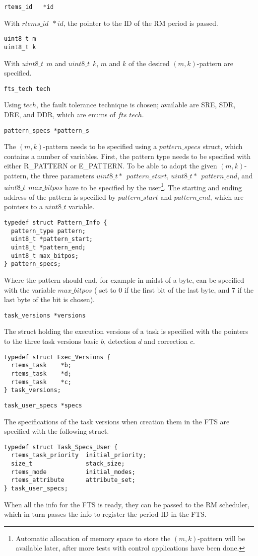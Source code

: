 \begin{verbatim}
rtems_id   *id
\end{verbatim}
With $rtems\_id~~*id$, the pointer to the ID of the RM period is passed. 
\begin{verbatim}
uint8_t m
uint8_t k
\end{verbatim}
With $uint8\_t~~m$ and $uint8\_t~~k$, $m$ and $k$ of the desired $(m,k)$-pattern are specified.
\begin{verbatim}
fts_tech tech
\end{verbatim}
Using $tech$, the fault tolerance technique is chosen; available are \mbox{SRE}, \mbox{SDR}, \mbox{DRE}, and \mbox{DDR}, which are enums of $fts\_tech$.
\begin{verbatim}
pattern_specs *pattern_s
\end{verbatim}
The $(m,k)$-pattern needs to be specified using a $pattern\_specs$ struct, which contains a number of variables. First, the pattern type needs to be specified with either \mbox{R\_PATTERN} or \mbox{E\_PATTERN}. To be able to adopt the given $(m,k)$-pattern, the three parameters $uint8\_t*~~  pattern\_start$, $uint8\_t*~~pattern\_end$, and $uint8\_t~~max\_bitpos$ have to be specified by the user\footnote{Automatic allocation of memory space to store the $(m,k)$-pattern will be available later, after more tests with control applications have been done.}.
The starting and ending address of the pattern is specified by $pattern\_start$ and $pattern\_end$, which are pointers to a $uint8\_t$ variable.
\begin{verbatim}
typedef struct Pattern_Info {
  pattern_type pattern;
  uint8_t *pattern_start;
  uint8_t *pattern_end;
  uint8_t max_bitpos;
} pattern_specs;
\end{verbatim} 
Where the pattern should end, for example in midst of a byte, can be specified with the variable $max\_bitpos$ ( set to 0 if the first bit of the last byte, and 7 if the last byte of the bit is chosen).
\begin{verbatim}
task_versions *versions
\end{verbatim}
The struct holding the execution versions of a task is specified with the pointers to the three task versions basic $b$, detection $d$ and correction $c$.
\begin{verbatim}
typedef struct Exec_Versions {
  rtems_task    *b;
  rtems_task    *d;
  rtems_task    *c;
} task_versions;
\end{verbatim}

\begin{verbatim}
task_user_specs *specs
\end{verbatim}
The specifications of the task versions when creation them in the FTS are specified with the following struct.
\begin{verbatim}
typedef struct Task_Specs_User {
  rtems_task_priority  initial_priority;
  size_t               stack_size;
  rtems_mode           initial_modes;
  rtems_attribute      attribute_set;
} task_user_specs;
\end{verbatim}
When all the info for the FTS is ready, they can be passed to the RM scheduler, which in turn passes the info to register the period ID in the FTS.

